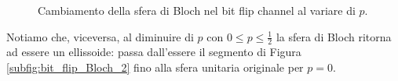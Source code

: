 \begin{esempio}
    \begin{figure}[!ht]
	\centering	
	 \quad
	\caption{Cambiamento della sfera di Bloch nel bit flip channel al variare di $p$.}
    \label{fig:bit_flip_Bloch}
    \end{figure}
    \noindent Notiamo che, viceversa, al diminuire di $p$ con $0 \leq p \leq \frac{1}{2}$ la sfera di Bloch ritorna ad essere un ellissoide: passa dall'essere il segmento di Figura \ref{subfig:bit_flip_Bloch_2} fino alla sfera unitaria originale per $p= 0$. 
\end{esempio}


